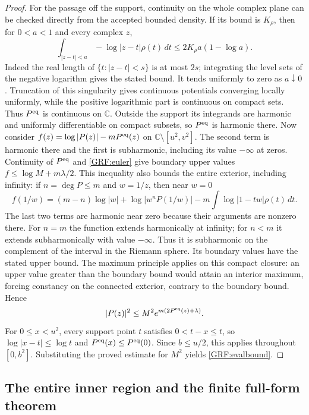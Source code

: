 \documentclass[11pt,a4paper]{article}
\begin{document}
\begin{proof}
For the passage off the support, continuity on the whole complex plane can
be checked directly from the accepted bounded density. If its bound is
$K_\rho$, then for $0<a<1$ and every complex $z$,
\[
 \int_{|z-t|<a}-\log|z-t|\rho(t)\,d t
 \le2K_\rho a(1-\log a).
\]
Indeed the real length of $\{t:|z-t|<s\}$ is at most $2s$; integrating
the level sets of the negative logarithm gives the stated bound.
It tends uniformly to zero as $a\downarrow0$. Truncation of this
singularity gives continuous potentials converging locally uniformly,
while the positive logarithmic part is continuous on compact sets.
Thus $P^{\rm eq}$ is continuous on $\mathbb C$. Outside the support its
integrands are harmonic and uniformly differentiable on compact subsets,
so $P^{\rm eq}$ is harmonic there.
Now consider
$f(z)=\log|P(z)|-mP^{\rm eq}(z)$ on
$\mathbb C\setminus[u^2,v^2]$. The second term is harmonic there and the first
is subharmonic, including its value $-\infty$ at zeros. Continuity of
$P^{\rm eq}$ and \eqref{GRF:euler} give boundary upper values
$f\le\log M+m\lambda/2$. This inequality also bounds the entire exterior,
including infinity: if $n=\deg P\le m$ and $w=1/z$, then near $w=0$
\[
 f(1/w)=(m-n)\log|w|
 +\log|w^nP(1/w)|
 -m\int\log|1-tw|\rho(t)\,d t.
\]
The last two terms are harmonic near zero because their arguments are
nonzero there. For $n=m$ the function extends harmonically at infinity;
for $n<m$ it extends subharmonically with value $-\infty$. Thus it is
subharmonic on the complement of the interval in the Riemann sphere.
Its boundary values have the stated upper bound. The maximum principle
applies on this compact closure: an upper value greater than the boundary
bound would attain an interior maximum, forcing constancy on the connected
exterior, contrary to the boundary bound. Hence
\[
 |P(z)|^2\le M^2 e^{m(2P^{\rm eq}(z)+\lambda)}.
\]
For $0\le x<u^2$, every support point $t$ satisfies
$0<t-x\le t$, so
$\log|x-t|\le\log t$ and
$P^{\rm eq}(x)\le P^{\rm eq}(0)$.
Since $b\le u/2$, this applies throughout $[0,b^2]$.
Substituting the proved estimate for $M^2$ yields \eqref{GRF:evalbound}.
\end{proof}

\subsection{The entire inner region and the finite full-form theorem}
\end{document}
